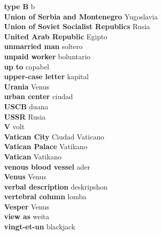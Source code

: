 \textbf{ type B  } b \\
\textbf{ Union of Serbia and Montenegro  } Yugoslavia \\
\textbf{ Union of Soviet Socialist Republics  } Rusia \\
\textbf{ United Arab Republic  } Egipto \\
\textbf{ unmarried man  } soltero \\
\textbf{ unpaid worker  } boluntario \\
\textbf{ up to  } capabel \\
\textbf{ upper-case letter  } kapital \\
\textbf{ Urania  } Venus \\
\textbf{ urban center  } ciudad \\
\textbf{ USCB  } duana \\
\textbf{ USSR  } Rusia \\
\textbf{ V  } volt \\
\textbf{ Vatican City  } Ciudad Vaticano \\
\textbf{ Vatican Palace  } Vatikano \\
\textbf{ Vatican  } Vatikano \\
\textbf{ venous blood vessel  } ader \\
\textbf{ Venus  } Venus \\
\textbf{ verbal description  } deskripshon \\
\textbf{ vertebral column  } lomba \\
\textbf{ Vesper  } Venus \\
\textbf{ view as  } weita \\
\textbf{ vingt-et-un  } blackjack \\
